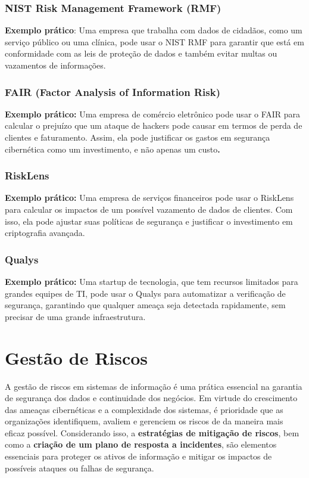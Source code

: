 \documentclass[12pt,oneside,a4paper,article]{abntex2}
\begin{document}
\subsubsection{\textbf{NIST Risk Management Framework (RMF})
}
\textbf{Exemplo prático}: Uma empresa que trabalha com dados de cidadãos, como um serviço público ou uma clínica, pode usar o NIST RMF para garantir que está em conformidade com as leis de proteção de dados e também evitar multas ou vazamentos de informações.

\subsubsection{\textbf{FAIR (Factor Analysis of Information Risk)
}}

\textbf{Exemplo prático:} Uma empresa de comércio eletrônico pode usar o FAIR para calcular o prejuízo que um ataque de hackers pode causar em termos de perda de clientes e faturamento. Assim, ela pode justificar os gastos em segurança cibernética como um investimento, e não apenas um custo\textbf{.}

\subsubsection{\textbf{RiskLens}}

{\textbf{Exemplo prático:} Uma empresa de serviços financeiros pode usar o RiskLens para calcular os impactos de um possível vazamento de dados de clientes. Com isso, ela pode ajustar suas políticas de segurança e justificar o investimento em criptografia avançada.}

\subsubsection{\textbf{Qualys}}

\textbf{Exemplo prático: }Uma startup de tecnologia, que tem recursos limitados para grandes equipes de TI, pode usar o Qualys para automatizar a verificação de segurança, garantindo que qualquer ameaça seja detectada rapidamente, sem precisar de uma grande
infraestrutura.



\section{Gestão de Riscos}
{A gestão de riscos em sistemas de informação é uma prática essencial na garantia de segurança dos dados e continuidade dos negócios. Em virtude do crescimento das ameaças cibernéticas e a complexidade dos sistemas, é prioridade que as organizações identifiquem, avaliem e gerenciem os riscos de da maneira mais eficaz possível. Considerando isso, a \textbf{estratégias de mitigação de riscos}, bem como a \textbf{criação de um plano de resposta a incidentes}, são elementos essenciais para proteger os ativos de informação e mitigar os impactos de possíveis ataques ou falhas de segurança.
}
\end{document}
